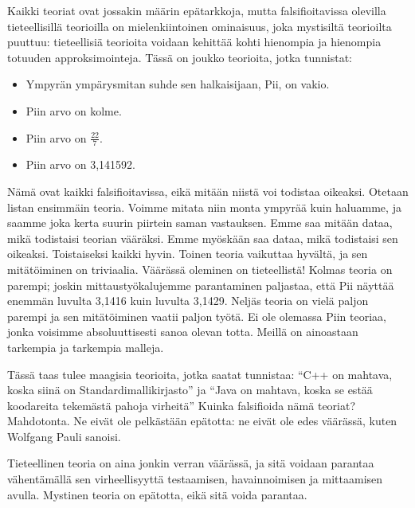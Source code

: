 Kaikki teoriat ovat jossakin määrin epätarkkoja, mutta falsifioitavissa olevilla tieteellisillä teorioilla on mielenkiintoinen ominaisuus, joka mystisiltä teorioilta puuttuu: tieteellisiä teorioita voidaan kehittää kohti hienompia ja hienompia totuuden approksimointeja. Tässä on joukko teorioita, jotka tunnistat:
\begin{itemize}
\item Ympyrän ympärysmitan suhde sen halkaisijaan, Pii, on vakio.
\item Piin arvo on kolme.
\item Piin arvo on \(\frac{22}{7}\).
\item Piin arvo on {3,}141592.
\end{itemize}
Nämä ovat kaikki falsifioitavissa, eikä mitään niistä voi todistaa oikeaksi. Otetaan listan ensimmäin teoria. Voimme mitata niin monta ympyrää kuin haluamme, ja saamme joka kerta suurin piirtein saman vastauksen. Emme saa mitään dataa, mikä todistaisi teorian vääräksi. Emme myöskään saa dataa, mikä todistaisi sen oikeaksi. Toistaiseksi kaikki hyvin. Toinen teoria vaikuttaa hyvältä, ja sen mitätöiminen on triviaalia. Väärässä oleminen on tieteellistä! Kolmas teoria on parempi; joskin mittaustyökalujemme parantaminen paljastaa, että Pii näyttää enemmän luvulta {3,}1416 kuin luvulta {3,}1429. Neljäs teoria on vielä paljon parempi ja sen mitätöiminen vaatii paljon työtä. Ei ole olemassa Piin teoriaa, jonka voisimme absoluuttisesti sanoa olevan totta. Meillä on ainoastaan tarkempia ja tarkempia malleja.

Tässä taas tulee maagisia teorioita, jotka saatat tunnistaa: ``C++ on mahtava, koska siinä on Standardimallikirjasto\vmq{,}'' ja ``Java on mahtava, koska se estää koodareita tekemästä pahoja virheitä'' Kuinka falsifioida nämä teoriat? Mahdotonta. Ne eivät ole pelkästään epätotta: ne eivät ole edes väärässä, kuten Wolfgang Pauli sanoisi.

Tieteellinen teoria on aina jonkin verran väärässä, ja sitä voidaan parantaa vähentämällä sen virheellisyyttä testaamisen, havainnoimisen ja mittaamisen avulla. Mystinen teoria on epätotta, eikä sitä voida parantaa.

